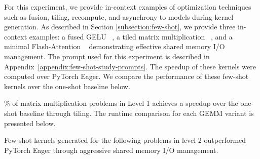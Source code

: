 
For this experiment, we provide in-context examples of optimization techniques such as fusion, tiling, recompute, and asynchrony to models during kernel generation. As described in Section \ref{subsection:few-shot}, we provide three in-context examples: a fused GELU ~\cite{hendrycks2023gaussianerrorlinearunits}, a tiled matrix multiplication ~\cite{mills2024cuda}, and a minimal Flash-Attention ~\cite{dao2022flashattention, kim2024flashattention} demonstrating effective shared memory I/O management. The prompt used for this experiment is described in Appendix~\ref{appendix:few-shot-study-prompts}. The speedup of these kernels were computed over PyTorch Eager. We compare the performance of these few-shot kernels over the one-shot baseline below.


\FloatBarrier

\% of matrix multiplication problems in Level 1 achieves a speedup over the one-shot baseline through tiling. The runtime comparison for each GEMM variant is presented below.


\noindent Few-shot kernels generated for the following problems in level 2 outperformed PyTorch Eager through aggressive shared memory I/O management.
